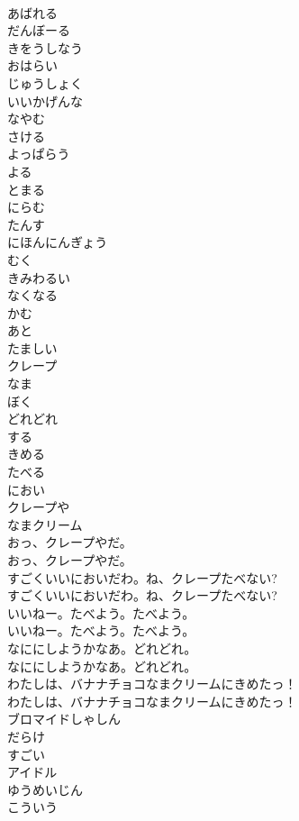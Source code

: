 \documentclass[8pt]{extreport}
\begin{document}
\begin{CJK}{UTF8}{min}
\\	あばれる
\\	だんぼーる
\\	きをうしなう
\\	おはらい
\\	じゅうしょく
\\	いいかげんな
\\	なやむ
\\	さける
\\	よっぱらう
\\	よる
\\	とまる
\\	にらむ
\\	たんす
\\	にほんにんぎょう
\\	むく
\\	きみわるい
\\	なくなる
\\	かむ
\\	あと
\\	たましい
\\	クレープ
\\	なま
\\	ぼく
\\	どれどれ
\\	する
\\	きめる
\\	たべる
\\	におい
\\	クレープや
\\	なまクリーム
\\	おっ、クレープやだ。
\\	おっ、クレープやだ。
\\	すごくいいにおいだわ。ね、クレープたべない?
\\	すごくいいにおいだわ。ね、クレープたべない?
\\	いいねー。たべよう。たべよう。
\\	いいねー。たべよう。たべよう。
\\	なににしようかなあ。どれどれ。
\\	なににしようかなあ。どれどれ。
\\	わたしは、バナナチョコなまクリームにきめたっ！
\\	わたしは、バナナチョコなまクリームにきめたっ！
\\	ブロマイドしゃしん
\\	だらけ
\\	すごい
\\	アイドル
\\	ゆうめいじん
\\	こういう

\end{CJK}
\end{document}
